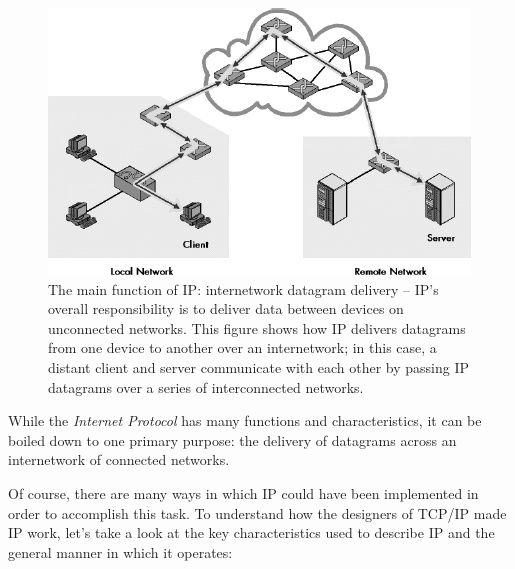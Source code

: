 \begin{figure}
   \centering
   \includegraphics[width=.7\textwidth]{images/ip-main-function.jpg}
   \caption{The main function of IP: internetwork datagram delivery -- IP's overall responsibility is to deliver data between devices on unconnected networks. This figure shows how IP delivers datagrams from one device to another over an internetwork; in this case, a distant client and server communicate with each other by passing IP datagrams over a series of interconnected networks.}
   \label{fig:ip-main-function}
\end{figure}


\begin{keyconcept}
While the \emph{Internet Protocol} has many functions and characteristics, it can be boiled down to one primary purpose: the delivery of datagrams across an internetwork of connected
networks.
\end{keyconcept}

Of course, there are many ways in which IP could have been implemented in order to accomplish this task.
To understand how the designers of TCP/IP made IP work, let's take a look at the key characteristics used to describe IP and the general manner in which it operates:


